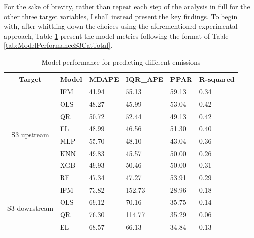 \documentclass[12pt,twoside]{report}
\begin{document}
For the sake of brevity, rather than repeat each step of the analysis in full for the other three target variables, I shall instead present the key findings. To begin with, after whittling down the choices using the aforementioned experimental approach, Table \ref{tab:ModelPerformanceComparison} present the model metrics following the format of Table \ref{tab:ModelPerformanceS3CatTotal}.

\begin{table}[htbp]
\caption{Model performance for predicting different emissions}
\label{tab:ModelPerformanceComparison}
\begin{tabular}{llllll}
\multicolumn{1}{c}{Target}                          & Model & MDAPE & IQR\_APE & PPAR  & R-squared \\ \hline
\multicolumn{1}{c|}{\multirow{8}{*}{S3 upstream}}   & IFM   & \cellcolor[HTML]{C6EFCE}41.94 & 55.13    & \cellcolor[HTML]{C6EFCE}59.13 & 0.34      \\
\multicolumn{1}{c|}{}                               & OLS   & 48.27 & 45.99    & 53.04 & \cellcolor[HTML]{C6EFCE}0.42      \\
\multicolumn{1}{c|}{}                               & QR    & 50.72 & 52.44    & 49.13 & \cellcolor[HTML]{C6EFCE}0.42      \\
\multicolumn{1}{c|}{}                               & EL    & 48.99 & 46.56    & 51.30 & 0.40      \\
\multicolumn{1}{c|}{}                               & MLP   & 55.70 & 48.10    & 43.04 & 0.36      \\
\multicolumn{1}{c|}{}                               & KNN   & 49.83 & \cellcolor[HTML]{C6EFCE}45.57    & 50.00 & 0.26      \\
\multicolumn{1}{c|}{}                               & XGB   & 49.93 & 50.46    & 50.00 & 0.31      \\
\multicolumn{1}{c|}{}                               & RF    & 47.34 & 47.27    & 53.91 & 0.29      \\ \hline
\multicolumn{1}{l|}{\multirow{8}{*}{S3 downstream}} & IFM   & 73.82 & 152.73   & 28.96 & \cellcolor[HTML]{C6EFCE}0.18      \\
\multicolumn{1}{l|}{}                               & OLS   & 69.12 & 70.16    & 35.75 & 0.14      \\
\multicolumn{1}{l|}{}                               & QR    & 76.30 & 114.77   & 35.29 & 0.06      \\
\multicolumn{1}{l|}{}                               & EL    & 68.57 & 66.13    & 34.84 & 0.13      \\

\end{tabular}
\end{table}
\end{document}
